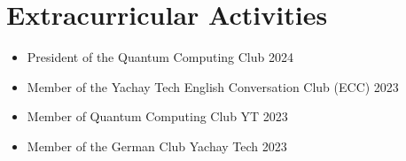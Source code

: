 \documentclass[a4paper,12pt]{article}
\begin{document}
\section{Extracurricular Activities}
\begin{itemize}
    \item President of the Quantum Computing Club \hfill {2024}
    \item Member of the Yachay Tech English Conversation Club (ECC) \hfill {2023}
    \item Member of Quantum Computing Club YT \hfill {2023}
    \item Member of the German Club Yachay Tech \hfill {2023}
\end{itemize}

\vfill
{}
\end{document}

